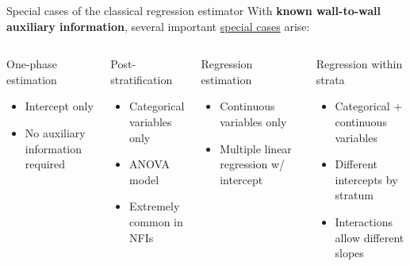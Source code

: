 \documentclass[
  ignorenonframetext,
  aspectratio=169,
]{beamer}
\begin{document}
\begin{frame}{Special cases of the classical regression estimator}
\label{special-cases-of-the-classical-regression-estimator}
With \textbf{known wall-to-wall auxiliary information}, several
important \underline{special cases} arise: \vspace{.3cm}

\begin{columns}[T]


{
\begin{block}{One-phase estimation}
\begin{itemize}
\item Intercept only
\item No auxiliary information required
\end{itemize}
\end{block}
}

{
\begin{block}{Post-stratification}
\begin{itemize}
\item Categorical variables only
\item ANOVA model
\item Extremely common in NFIs
\end{itemize}
\end{block}
}


{
\begin{block}{Regression estimation}
\begin{itemize}
\item Continuous variables only
\item Multiple linear regression w/ intercept
\end{itemize}
\end{block}
}

{
\begin{block}{Regression within strata}
\begin{itemize}
\item Categorical + continuous variables
\item Different intercepts by stratum
\item Interactions allow different slopes
\end{itemize}
\end{block}
}


\end{columns}
\end{frame}
\end{document}
